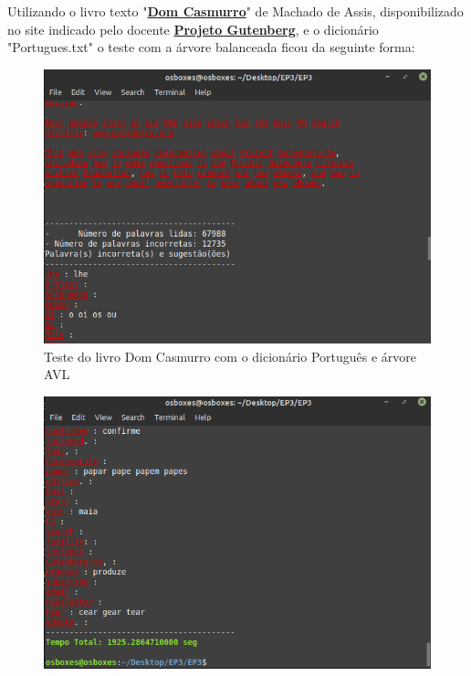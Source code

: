 \documentclass[12pt]{article}
\begin{document}
	Utilizando o livro texto "\textbf{\href{https://www.gutenberg.org/ebooks/55752}{Dom Casmurro}}" de Machado de Assis, disponibilizado no site indicado pelo docente \textbf{\href{https://www.gutenberg.org}{Projeto Gutenberg}}, e o dicionário "Portugues.txt" o teste com a árvore balanceada ficou da seguinte forma:
	
	\begin{center}
		\begin{figure}[!h]
			\includegraphics[scale = 0.7]{testedomcasmurro1.png}
			\caption{Teste do livro Dom Casmurro com o dicionário Português e árvore AVL}
		\end{figure}
	\end{center}

	\begin{center}
		\begin{figure}[!h]
			\includegraphics[scale = 0.7]{testedomcasmurro.png}
		\end{figure}
	\end{center}
\end{document}
